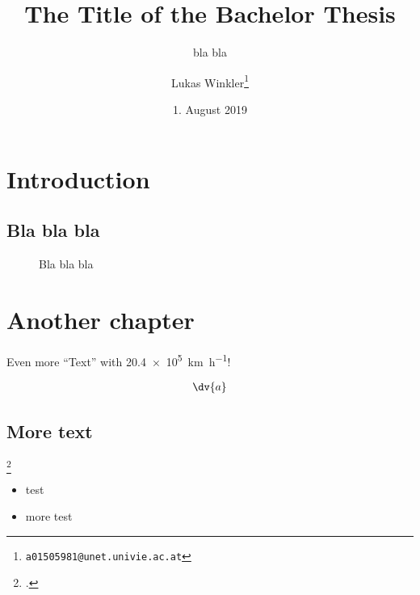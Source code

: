 
\title{The Title of the Bachelor Thesis}
\subtitle{bla bla}
\author{Lukas Winkler\footnote{\texttt{a01505981@unet.univie.ac.at}}}
\date{1. August 2019}

\usepackage{lipsum}  %
\newcommand{\blabla}{Bla bla bla}


	
\maketitle

\tableofcontents

\chapter{Introduction}\label{introduction}

\lipsum[1]

\section{\blabla}

\lipsum[1-2]


\begin{figure}
	\centering
	\caption{\blabla}
	\label{fig:bla}
\end{figure}

\chapter{Another chapter}

\lipsum[1-2]

Even more \enquote{Text} with \SI{20.4e5}{\kilo\meter\per\hour}!

\begin{align}
	\dv{a}
\end{align}

\section{More text}

\lipsum[2-5]\footcite{guowhite}



\begin{itemize}
\setlength\itemsep{-0.5em}
\item test
\item more test
\end{itemize}

